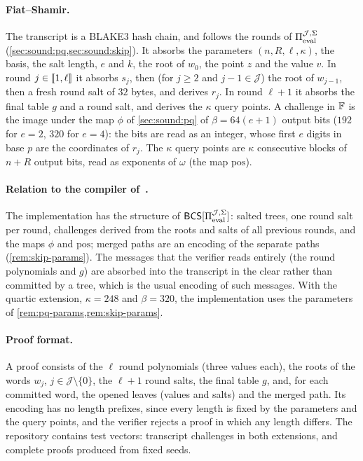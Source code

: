 \paragraph{Fiat--Shamir.}
The transcript is a BLAKE3 hash chain, and follows the rounds of $\Pi_{\mathrm{eval}}^{\mathcal{J},\Sigma}$ (\cref{sec:sound:pq,sec:sound:skip}).
It absorbs the parameters $(n, R, \ell, \kappa)$, the basis, the salt length, $e$ and $k$, the root of $w_0$, the point $z$ and the value $v$.
In round $j \in \llbracket 1, \ell \rrbracket$ it absorbs $s_j$, then (for $j \ge 2$ and $j - 1 \in \mathcal{J}$) the root of $w_{j-1}$, then a fresh round salt of $32$ bytes, and derives $r_j$.
In round $\ell+1$ it absorbs the final table $g$ and a round salt, and derives the $\kappa$ query points.
A challenge in $\mathbb{F}$ is the image under the map $\phi$ of \cref{sec:sound:pq} of $\beta = 64(e+1)$ output bits ($192$ for $e = 2$, $320$ for $e = 4$): the bits are read as an integer, whose first $e$ digits in base $p$ are the coordinates of $r_j$.
The $\kappa$ query points are $\kappa$ consecutive blocks of $n + R$ output bits, read as exponents of $\omega$ (the map $\mathrm{pos}$).

\paragraph{Relation to the compiler of~\cite{CDHZ25}.}
The implementation has the structure of $\mathsf{BCS}[\Pi_{\mathrm{eval}}^{\mathcal{J},\Sigma}]$: salted trees, one round salt per round, challenges derived from the roots and salts of all previous rounds, and the maps $\phi$ and $\mathrm{pos}$; merged paths are an encoding of the separate paths (\cref{rem:skip-params}).
The messages that the verifier reads entirely (the round polynomials and $g$) are absorbed into the transcript in the clear rather than committed by a tree, which is the usual encoding of such messages.
With the quartic extension, $\kappa = 248$ and $\beta = 320$, the implementation uses the parameters of \cref{rem:pq-params,rem:skip-params}.

\paragraph{Proof format.}
A proof consists of the $\ell$ round polynomials (three values each), the roots of the words $w_j$, $j \in \mathcal{J} \setminus \{0\}$, the $\ell+1$ round salts, the final table $g$, and, for each committed word, the opened leaves (values and salts) and the merged path.
Its encoding has no length prefixes, since every length is fixed by the parameters and the query points, and the verifier rejects a proof in which any length differs.
The repository contains test vectors: transcript challenges in both extensions, and complete proofs produced from fixed seeds.

